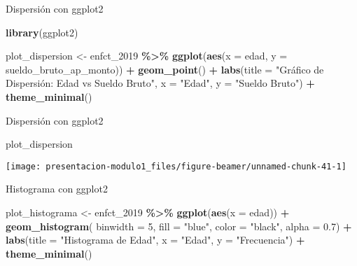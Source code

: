 \documentclass[
  ignorenonframetext,
]{beamer}
\newenvironment{Shaded}{\begin{snugshade}}{\end{snugshade}}
\newcommand{\AttributeTok}[1]{\textcolor[rgb]{0.13,0.29,0.53}{#1}}
\newcommand{\DecValTok}[1]{\textcolor[rgb]{0.00,0.00,0.81}{#1}}
\newcommand{\FloatTok}[1]{\textcolor[rgb]{0.00,0.00,0.81}{#1}}
\newcommand{\FunctionTok}[1]{\textcolor[rgb]{0.13,0.29,0.53}{\textbf{#1}}}
\newcommand{\NormalTok}[1]{#1}
\newcommand{\OtherTok}[1]{\textcolor[rgb]{0.56,0.35,0.01}{#1}}
\newcommand{\SpecialCharTok}[1]{\textcolor[rgb]{0.81,0.36,0.00}{\textbf{#1}}}
\newcommand{\StringTok}[1]{\textcolor[rgb]{0.31,0.60,0.02}{#1}}
\begin{document}
\begin{frame}[fragile]{Dispersión con ggplot2}
\label{dispersiuxf3n-con-ggplot2}
\begin{Shaded}
\begin{Highlighting}[]
\FunctionTok{library}\NormalTok{(ggplot2)}

\NormalTok{plot\_dispersion }\OtherTok{\textless{}{-}}\NormalTok{ enfct\_2019 }\SpecialCharTok{\%\textgreater{}\%} 
  \FunctionTok{ggplot}\NormalTok{(}\FunctionTok{aes}\NormalTok{(}\AttributeTok{x =}\NormalTok{ edad, }\AttributeTok{y =}\NormalTok{ sueldo\_bruto\_ap\_monto)) }\SpecialCharTok{+}
  \FunctionTok{geom\_point}\NormalTok{() }\SpecialCharTok{+}
  \FunctionTok{labs}\NormalTok{(}\AttributeTok{title =} \StringTok{"Gráfico de Dispersión: Edad vs Sueldo Bruto"}\NormalTok{,}
       \AttributeTok{x =} \StringTok{"Edad"}\NormalTok{,}
       \AttributeTok{y =} \StringTok{"Sueldo Bruto"}\NormalTok{) }\SpecialCharTok{+}
  \FunctionTok{theme\_minimal}\NormalTok{()}
\end{Highlighting}
\end{Shaded}
\end{frame}

\begin{frame}[fragile]{Dispersión con ggplot2}
\label{dispersiuxf3n-con-ggplot2-1}
\begin{Shaded}
\begin{Highlighting}[]
\NormalTok{plot\_dispersion}
\end{Highlighting}
\end{Shaded}

\begin{center}\texttt{[image: presentacion-modulo1\_files/figure-beamer/unnamed-chunk-41-1]} \end{center}
\end{frame}

\begin{frame}[fragile]{Histograma con ggplot2}
\label{histograma-con-ggplot2}
\begin{Shaded}
\begin{Highlighting}[]
\NormalTok{plot\_histograma }\OtherTok{\textless{}{-}}\NormalTok{ enfct\_2019 }\SpecialCharTok{\%\textgreater{}\%}
  \FunctionTok{ggplot}\NormalTok{(}\FunctionTok{aes}\NormalTok{(}\AttributeTok{x =}\NormalTok{ edad)) }\SpecialCharTok{+}
  \FunctionTok{geom\_histogram}\NormalTok{(}
    \AttributeTok{binwidth =} \DecValTok{5}\NormalTok{, }\AttributeTok{fill =} \StringTok{"blue"}\NormalTok{, }
    \AttributeTok{color =} \StringTok{"black"}\NormalTok{, }\AttributeTok{alpha =} \FloatTok{0.7}\NormalTok{) }\SpecialCharTok{+}
  \FunctionTok{labs}\NormalTok{(}\AttributeTok{title =} \StringTok{"Histograma de Edad"}\NormalTok{,}
       \AttributeTok{x =} \StringTok{"Edad"}\NormalTok{,}
       \AttributeTok{y =} \StringTok{"Frecuencia"}\NormalTok{) }\SpecialCharTok{+}
  \FunctionTok{theme\_minimal}\NormalTok{()}
\end{Highlighting}
\end{Shaded}
\end{frame}
\end{document}
